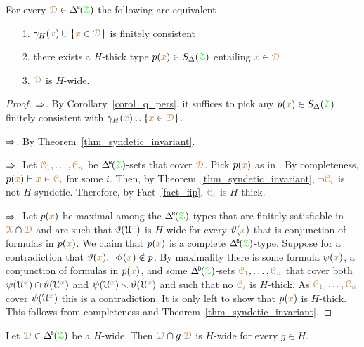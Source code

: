 \begin{theorem}\label{thm_syndetic_invariant2}
  For every $\mrD\in\BDelta(\grZ)$ the following are equivalent 
  \begin{itemize}
    \item[1.] $\gamma_H({\color{brown} x})\cup\{{\color{brown} x}\in{\color{brown}\EuScript D}\}$ is finitely consistent
    \item[2.] there exists a $H$-thick type $p({\color{brown} x})\in S_\Delta({\color{green}\EuScript Z})$ entailing ${\color{brown} x}\in{\color{brown}\EuScript D}$
    \item[3.] ${\color{brown}\EuScript D}$ is $H$-wide.\smallskip
  \end{itemize}
\end{theorem}

\begin{proof}
  $\Rightarrow$.
  By Corollary~\ref{corol_q_pers}, it suffices to pick any $p({\color{brown} x})\in S_\Delta({\color{green}\EuScript Z})$ finitely consistent with $\gamma_H({\color{brown} x})\cup\{{\color{brown} x}\in{\color{brown}\EuScript D}\}$.

  $\Rightarrow$.
  By Theorem~\ref{thm_syndetic_invariant}.

  $\Rightarrow$.
  Let ${\color{brown}\EuScript C_1},\dots,{\color{brown}\EuScript C_n}$ be $\BDelta({\grZ})$-sets that cover ${\color{brown}\EuScript D}$.
  Pick $p({\color{brown} x})$ as in .
  By completeness, $p({\color{brown} x})\vdash {\color{brown}x}\in{\color{brown}\EuScript C_i}$ for some $i$.
  Then, by Theorem~\ref{thm_syndetic_invariant}, $\neg{\color{brown}\EuScript C_i}$ is not $H$-syndetic.
  Therefore, by Fact~\ref{fact_fip}, ${\color{brown}\EuScript C_i}$ is $H$-thick.

  $\Rightarrow$.
  Let $p({\color{brown} x})$ be maximal among the $\BDelta({\grZ})$-types that are finitely satisfiable in ${\color{brown}\EuScript X}\cap{\color{brown}\EuScript D}$ and are such that $\vartheta(\EuScript U^{\color{brown} x})$ is $H$-wide for every $\vartheta({\color{brown} x})$ that is conjunction of formulas in $p({\color{brown} x})$.
  We claim that $p({\color{brown} x})$ is a complete $\BDelta({\grZ})$-type.
  Suppose for a contradiction that $\vartheta({\color{brown} x}),\neg\vartheta({\color{brown} x})\notin p$.
  By maximality there is some formula $\psi({\color{brown} x})$, a conjunction of formulas in $p({\color{brown} x})$, and some $\BDelta({\grZ})$-sets ${\color{brown}\EuScript C_1},\dots,{\color{brown}\EuScript C_n}$ that cover both $\psi(\EuScript U^{\color{brown} x})\cap\vartheta(\EuScript U^{\color{brown} x})$ and $\psi(\EuScript U^{\color{brown} x})\smallsetminus\vartheta(\EuScript U^{\color{brown} x})$ and such that no ${\color{brown}\EuScript C_i}$ is $H$-thick.
  As ${\color{brown}\EuScript C_1},\dots,{\color{brown}\EuScript C_n}$ cover $\psi(\EuScript U^{\color{brown} x})$ this is a contradiction.
  It is only left to show that $p({\color{brown} x})$ is $H$-thick.
  This follows from completeness and Theorem~\ref{thm_syndetic_invariant}.
\end{proof}

\begin{corollary}\label{corol_intersectionGwide}
  Let $\mrD\in\BDelta(\grZ)$ be a $H$-wide.
  Then ${\color{brown}\EuScript D}\cap g{\cdot}{\color{brown}\EuScript D}$ is $H$-wide for every $g\in H$.
\end{corollary}

